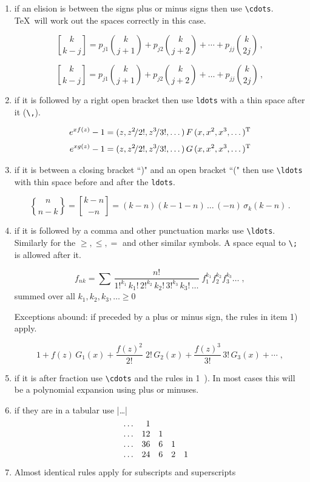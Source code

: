 \begin{enumerate}
\item if an elision is between the signs plus or minus signs then use \verb+\cdots+. \TeX\ will work out the spaces correctly in this case.

\[{k\brack k-j}=p_{j1}{k\choose j+1}+p_{j2}{k\choose j+2}+\cdots
+p_{jj}{k\choose 2j}\,,\]


\[{k\brack k-j}=p_{j1}{k\choose j+1}+p_{j2}{k\choose j+2}+\dots
+p_{jj}{k\choose 2j}\,,\]



\item if it is followed by a right open bracket then use \verb+ldots+ with a thin space after it (\verb+\,+).

\begin{align*}
e^{xf(z)}-1
&=(z,z^2\!/2!,z^3\!/3!,\ldots\,)\,F\,(x,x^2,x^3,\ldots\,)^{\rm T}\\
\noalign{\smallskip}
e^{xg(z)}-1
&=(z,z^2\!/2!,z^3\!/3!,\ldots\,)\,G\,(x,x^2,x^3,\dots)^{\rm T}
\end{align*}


\item if it is between a closing bracket ``)" and an open bracket ``(" then use \verb|\ldots| with thin space before and after the \verb|ldots|.

$${n\brace n-k}={k-n\brack
-n}=(k-n)(k-1-n)\,\ldots\,(-n)\,\sigma_k(k-n)\,.$$


\item if it is followed by a comma and other punctuation marks use \verb+\ldots+. Similarly for the $\geq, \leq, =$ and other similar symbols. A space equal to \verb|\;| is allowed after it.

$$f_{nk}=\sum\,{\frac{n!}{
1!^{k_1}\,k_1!\,2!^{k_2}\,k_2!\,3!^{k_3}\,k_3!\,\ldots}}\; 
f_1^{k_1}f_2^{k_2}f_3^{k_3}\ldots\;,$$
summed over all $k_1,k_2,k_3,\ldots\geq 0$ 




Exceptions abound: if preceded by a plus or minus sign, the rules in item 1) apply.

\[1+f(z)\,G_1(x)+{\frac{f(z)^2}{2!}}\;2!\,G_2(x)+{\frac{f(z)^3}{3!}}\,3!\,G_3(x)+\cdots\;,\]

\item if it is after fraction use \verb+\cdots+ and the rules in 1~). In most cases this will be a polynomial expansion using plus or minuses.




\item if they are in a tabular use |\ldots|
$$\vcenter{\halign{
\hfil#\quad
&\hfil#\quad
&\hfil#\quad
&\hfil#\quad
&\hfil#\quad
&\hfil#\quad
&\hfil#\quad
&\hfil#\quad
&\hfil#\quad
&\hfil#\quad
&\hfil#\cr
$\ldots$&1\cr
$\ldots$&12&1\cr
$\ldots$&36&6&1\cr
$\ldots$&24&6&2&1\cr
}}$$

\item Almost identical rules apply for subscripts and superscripts
\end{enumerate}

